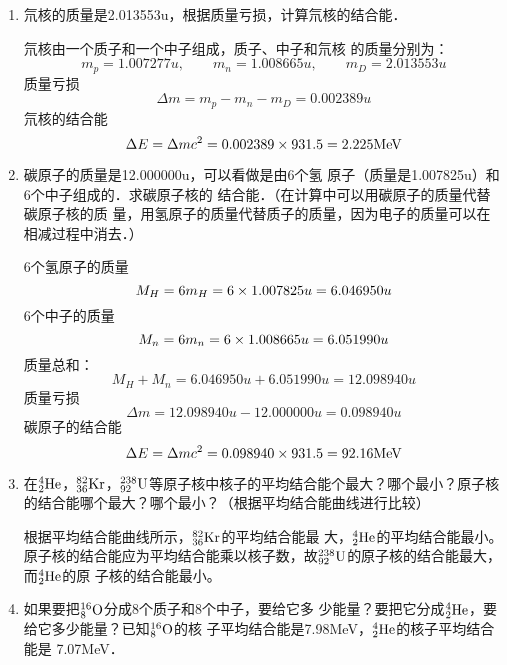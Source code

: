\begin{enumerate}
    \item 氘核的质量是2.013553u，根据质量亏损，计算氘核的结合能．

    \begin{solution}
氘核由一个质子和一个中子组成，质子、中子和氘核
的质量分别为：
\[m_p=1.007277u,\qquad m_n=1.008665u,\qquad m_D=2.013553u\]
质量亏损 
\[\Delta m=m_p-m_n-m_D=0.002389u\]
氘核的结合能
\[\Delta E=\Delta mc^2=0.002389\x 931.5=2.225{\rm MeV}\]
    \end{solution}
    \item 碳原子的质量是12.000000u，可以看做是由6个氢
原子（质量是1.007825u）和6个中子组成的．求碳原子核的
结合能．（在计算中可以用碳原子的质量代替碳原子核的质
量，用氢原子的质量代替质子的质量，因为电子的质量可以在
相减过程中消去．）

\begin{solution}
    6个氢原子的质量
\[M_H=6m_H=6\x 1.007825u=6.046950u\]
6个中子的质量
\[M_n=6m_n=6\x1.008665u=6.051990u\]
质量总和：
\[M_H+M_n=6.046950u+6.051990u=12.098940u\]
质量亏损
\[\Delta m=12.098940u-12.000000u=0.098940u\]
碳原子的结合能
\[\Delta E=\Delta mc^2=0.098940\x931.5=92.16{\rm MeV}\]
\end{solution}
\item  在$\atom{He}{4}{2}$，$\atom{Kr}{82}{36}$，$\atom{U}{238}{92}$等原子核中核子的平均结合能个最大？哪个最小？原子核的结合能哪个最大？哪个最小？（根据平均结合能曲线进行比较）


\begin{solution}
    根据平均结合能曲线所示，$\atom{Kr}{82}{36}$的平均结合能最
    大，$\atom{He}{4}{2}$的平均结合能最小。原子核的结合能应为平均结合能乘以核子数，故$\atom{U}{238}{92}$的原子核的结合能最大，而$\atom{He}{4}{2}$的原
    子核的结合能最小。
\end{solution}
\item 如果要把$\atom{O}{16}{8}$分成8个质子和8个中子，要给它多
少能量？要把它分成$\atom{He}{4}{2}$，要给它多少能量？已知$\atom{O}{16}{8}$的核
子平均结合能是7.98MeV，$\atom{He}{4}{2}$的核子平均结合能是
7.07MeV．


\end{enumerate}

